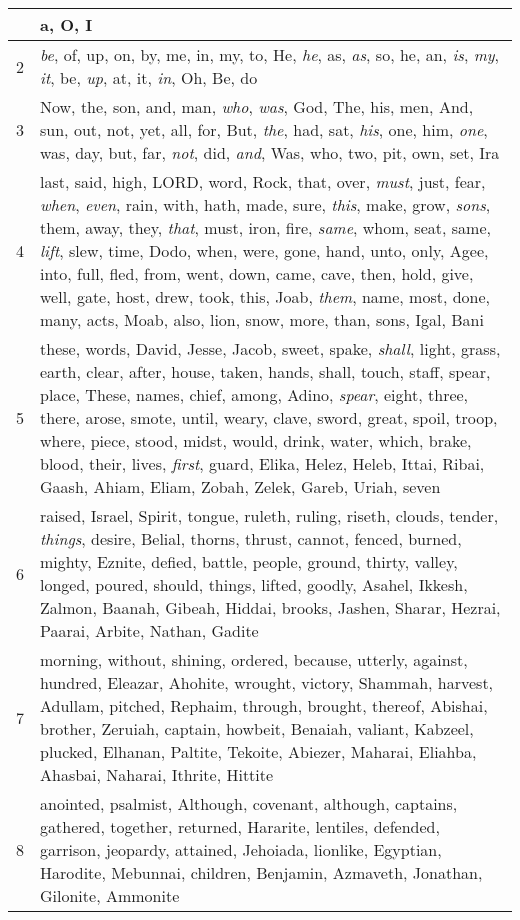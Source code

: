 \begin{longtable}{l|p{3.75in}}
\hline \hline
\endlastfoot
1 & a, O, I \\ \hline
2 & \emph{be}, of, up, on, by, me, in, my, to, He, \emph{he}, as, \emph{as}, so, he, an, \emph{is}, \emph{my}, \emph{it}, be, \emph{up}, at, it, \emph{in}, Oh, Be, do \\ \hline
3 & Now, the, son, and, man, \emph{who}, \emph{was}, God, The, his, men, And, sun, out, not, yet, all, for, But, \emph{the}, had, sat, \emph{his}, one, him, \emph{one}, was, day, but, far, \emph{not}, did, \emph{and}, Was, who, two, pit, own, set, Ira \\ \hline
4 & last, said, high, LORD, word, Rock, that, over, \emph{must}, just, fear, \emph{when}, \emph{even}, rain, with, hath, made, sure, \emph{this}, make, grow, \emph{sons}, them, away, they, \emph{that}, must, iron, fire, \emph{same}, whom, seat, same, \emph{lift}, slew, time, Dodo, when, were, gone, hand, unto, only, Agee, into, full, fled, from, went, down, came, cave, then, hold, give, well, gate, host, drew, took, this, Joab, \emph{them}, name, most, done, many, acts, Moab, also, lion, snow, more, than, sons, Igal, Bani \\ \hline
5 & these, words, David, Jesse, Jacob, sweet, spake, \emph{shall}, light, grass, earth, clear, after, house, taken, hands, shall, touch, staff, spear, place, These, names, chief, among, Adino, \emph{spear}, eight, three, there, arose, smote, until, weary, clave, sword, great, spoil, troop, where, piece, stood, midst, would, drink, water, which, brake, blood, their, lives, \emph{first}, guard, Elika, Helez, Heleb, Ittai, Ribai, Gaash, Ahiam, Eliam, Zobah, Zelek, Gareb, Uriah, seven \\ \hline
6 & raised, Israel, Spirit, tongue, ruleth, ruling, riseth, clouds, tender, \emph{things}, desire, Belial, thorns, thrust, cannot, fenced, burned, mighty, Eznite, defied, battle, people, ground, thirty, valley, longed, poured, should, things, lifted, goodly, Asahel, Ikkesh, Zalmon, Baanah, Gibeah, Hiddai, brooks, Jashen, Sharar, Hezrai, Paarai, Arbite, Nathan, Gadite \\ \hline
7 & morning, without, shining, ordered, because, utterly, against, hundred, Eleazar, Ahohite, wrought, victory, Shammah, harvest, Adullam, pitched, Rephaim, through, brought, thereof, Abishai, brother, Zeruiah, captain, howbeit, Benaiah, valiant, Kabzeel, plucked, Elhanan, Paltite, Tekoite, Abiezer, Maharai, Eliahba, Ahasbai, Naharai, Ithrite, Hittite \\ \hline
8 & anointed, psalmist, Although, covenant, although, captains, gathered, together, returned, Hararite, lentiles, defended, garrison, jeopardy, attained, Jehoiada, lionlike, Egyptian, Harodite, Mebunnai, children, Benjamin, Azmaveth, Jonathan, Gilonite, Ammonite \\ \hline

\end{longtable}
